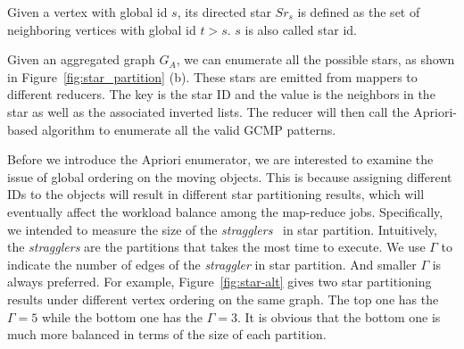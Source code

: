 \begin{definition}
Given a vertex with global id $s$, its directed star $Sr_s$ is defined as the set of neighboring vertices with global id $t>s$. $s$ is also called star id.
\end{definition}

Given an aggregated graph $G_A$, we can enumerate all the possible stars, 
as shown in  Figure~\ref{fig:star_partition} (b). These stars are emitted 
from mappers to different reducers. The key is the star ID and the value 
is the neighbors in the star as well as the associated inverted lists. 
The reducer will then call the Apriori-based algorithm to enumerate all the valid GCMP patterns.


Before we introduce the Apriori enumerator, we are interested to 
examine the issue of global ordering on the moving objects.
This is because assigning different IDs to the objects will result in 
different star partitioning results, which will eventually affect the workload 
balance among the map-reduce jobs. Specifically, we intended to 
measure the size of the \emph{stragglers}~\cite{kwon2012skewtune,xin2013shark,coppa2015data}
in star partition. Intuitively, the \emph{stragglers} are the partitions that
takes the most time to execute. We use $\Gamma$ to indicate the number of edges
of the \emph{straggler} in star partition. And smaller $\Gamma$ is always preferred.
For example, Figure~\ref{fig:star-alt} gives two star partitioning results under 
different vertex ordering on the same graph. The top one has the $\Gamma = 5$ while
the bottom one has the $\Gamma = 3$.
It is obvious that the bottom one is much more balanced in terms of the size of each partition.



